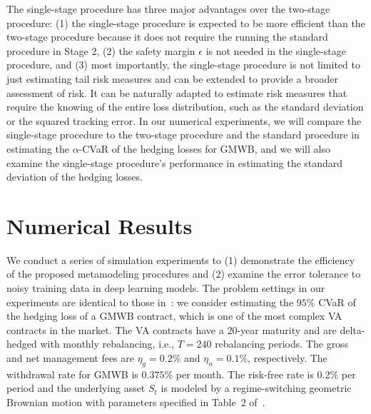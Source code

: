 \documentclass{article}
\begin{document}
The single-stage procedure has three major advantages over the two-stage procedure:
(1) the single-stage procedure is expected to be more efficient than the two-stage procedure because it does not require the running the standard procedure in Stage 2, 
(2) the safety margin $\epsilon$ is not needed in the single-stage procedure, and
(3) most importantly, the single-stage procedure is not limited to just estimating tail risk measures and can be extended to provide a broader assessment of risk. 
It can be naturally adapted to estimate risk measures that require the knowing of the entire loss distribution, such as the standard deviation or the squared tracking error.
In our numerical experiments, we will compare the single-stage procedure to the two-stage procedure and the standard procedure in estimating the $\alpha$-CVaR of the hedging losses for GMWB, and we will also examine the single-stage procedure's performance in estimating the standard deviation of the hedging losses.

\section{Numerical Results} \label{sec:numerical}

We conduct a series of simulation experiments to (1) demonstrate the efficiency of the proposed metamodeling procedures and (2) examine the error tolerance to noisy training data in deep learning models.
The problem settings in our experiments are identical to those in~\cite{dang2020efficient}:
we consider estimating the $95\%$ CVaR of the hedging loss of a GMWB contract, which is one of the most complex VA contracts in the market.
The VA contracts have a 20-year maturity and are delta-hedged with monthly rebalancing, i.e., $T=240$ rebalancing periods.
The gross and net management fees are $\eta_g = 0.2\%$ and $\eta_n=0.1\%$, respectively.
The withdrawal rate for GMWB is $0.375\%$ per month.
The risk-free rate is 0.2\% per period and the underlying asset $S_t$ is modeled by a regime-switching geometric Brownian motion with parameters specified in Table~2 of~\cite{dang2020efficient}.
\end{document}

